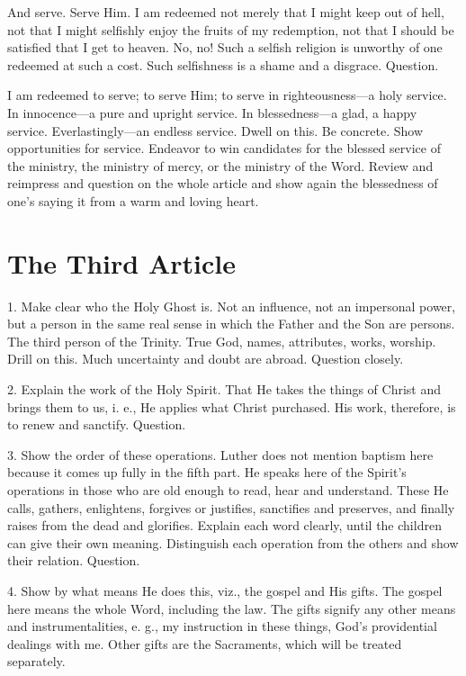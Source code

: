 And serve. Serve Him. I am redeemed not merely that I might keep out of hell, not that I might selfishly enjoy the fruits of my redemption, not that I should be satisfied that I get to heaven. No, no! Such a selfish religion is unworthy of one redeemed at such a cost. Such selfishness is a shame and a disgrace. Question.

I am redeemed to serve; to serve Him; to serve in righteousness—a holy service. In innocence—a pure and upright service. In blessedness—a glad, a happy service. Everlastingly—an endless service. Dwell on this. Be concrete. Show opportunities for service. Endeavor to win candidates for the blessed service of the ministry, the ministry of mercy, or the ministry of the Word. Review and reimpress and question on the whole article and show again the blessedness of one’s saying it from a warm and loving heart.

\section{The Third Article}

 1. Make clear who the Holy Ghost is. Not an influence, not an impersonal power, but a person in the same real sense in which the Father and the Son are persons.
The third person of the Trinity. True God, names, attributes, works, worship. Drill on this. Much uncertainty and doubt are abroad. Question closely.

 2. Explain the work of the Holy Spirit. That He takes the things of Christ and brings them to us, i. e., He applies what Christ purchased. His work, therefore, is to renew and sanctify. Question.

 3. Show the order of these operations. Luther does not mention baptism here because it comes up fully in the fifth part. He speaks here of the Spirit’s operations in those who are old enough to read, hear and understand. These He calls, gathers, enlightens, forgives or justifies, sanctifies and preserves, and finally raises from the dead and glorifies. Explain each word clearly, until the children can give their own meaning. Distinguish each operation from the others and show their relation. Question.

 4. Show by what means He does this, viz., the gospel and His gifts. The gospel here means the whole Word, including the law. The gifts signify any other means and instrumentalities, e. g., my instruction in these things, God’s providential dealings with me. Other gifts are the Sacraments, which will be treated separately.

